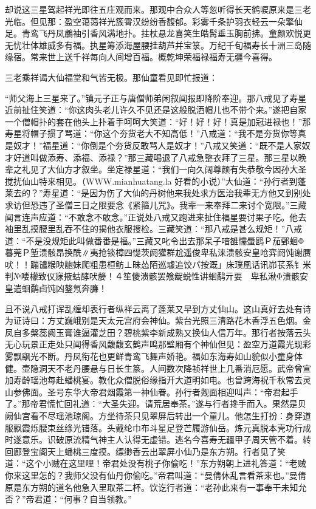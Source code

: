 \documentclass[12pt,UTF8]{ctexbook}
\begin{document}
却说这三星驾起祥光即往五庄观而来。那观中合众人等忽听得长天鹤唳原来是三老光临。但见那：盈空蔼蔼祥光簇霄汉纷纷香馥郁。彩雾千条护羽衣轻云一朵擎仙足。青鸾飞丹凤鷫袖引香风满地扑。拄杖悬龙喜笑生皓髯垂玉胸前拂。童颜欢悦更无忧壮体雄威多有福。执星筹添海屋腰挂葫芦并宝箓。万纪千旬福寿长十洲三岛随缘宿。常来世上送千祥每向人间增百福。概乾坤荣福禄福寿无疆今喜得。

三老乘祥谒大仙福堂和气皆无极。那仙童看见即忙报道：

“师父海上三星来了。”镇元子正与唐僧师弟闲叙闻报即降阶奉迎。那八戒见了寿星近前扯住笑道：“你这肉头老儿许久不见还是这般脱洒帽儿也不带个来。”遂把自家一个僧帽扑的套在他头上扑着手呵呵大笑道：“好！好！好！真是加冠进禄也！”那寿星将帽子掼了骂道：“你这个夯货老大不知高低！”八戒道：“我不是夯货你等真是奴才！”福星道：“你倒是个夯货反敢骂人是奴才！”八戒又笑道：“既不是人家奴才好道叫做添寿、添福、添禄？”那三藏喝退了八戒急整衣拜了三星。那三星以晚辈之礼见了大仙方才叙坐。坐定禄星道：“我们一向久阔尊颜有失恭敬今因孙大圣搅扰仙山特来相见。（WWW.mianhuatang.la 好看的小说）”大仙道：“孙行者到蓬莱去的？”寿星道：“是因为伤了大仙的丹树他来我处求方医治我辈无方他又到别处求访但恐违了圣僧三日之限要念《紧箍儿咒》。我辈一来奉拜二来讨个宽限。”三藏闻言连声应道：“不敢念不敢念。”正说处八戒又跑进来扯住福星要讨果子吃。他去袖里乱摸腰里乱吞不住的揭他衣服搜检。三藏笑道：“那八戒是甚么规矩！”八戒道：“不是没规矩此叫做番番是福。”三藏又叱令出去那呆子喑雒懦蜃鸥Ｐ茄鄄蛔Φ暮莞Ｐ堑溃骸昂换酰∥夷抢锬樟四憷茨阏獾群尬遥俊卑私涞溃骸安皇呛弈阏饨谢赝吠！！蹦谴糇映龅妹爬粗患桓鲂⊥昧怂陌巡璩追饺パ按溉」床璞凰话讯峁苌系钅米判№喽檬致仪寐掖蛄酵吠嫠！４笙傻溃骸罢飧龊蜕性讲蛔鹬亓耍　卑私湫Φ溃骸安皇遣蛔鹬卣饨凶鏊氖奔臁！

且不说八戒打诨乱缠却表行者纵祥云离了蓬莱又早到方丈仙山。这山真好去处有诗为证诗曰：方丈巍峨别是天太元宫府会神仙。紫台光照三清路花木香浮五色烟。金凤自多槃蕊阙玉膏谁逼灌芝田？碧桃紫李新成熟又换仙人信万年。那行者按落云头无心玩景正走处只闻得香风馥馥玄鹤声鸣那壁厢有个神仙但见：盈空万道霞光现彩雾飘飖光不断。丹凤衔花也更鲜青鸾飞舞声娇艳。福如东海寿如山貌似小童身体健。壶隐洞天不老丹腰悬与日长生篆。人间数次降祯祥世上几番消厄愿。武帝曾宣加寿龄瑶池每赴蟠桃宴。教化众僧脱俗缘指开大道明如电。也曾跨海祝千秋常去灵山参佛面。圣号东华大帝君烟霞第一神仙眷。孙行者觌面相迎叫声：“帝君起手了。”那帝君慌忙回礼道：“大圣失迎。请荒居奉茶。”遂与行者搀手而入。果然是贝阙仙宫看不尽瑶池琼阁。方坐待茶只见翠屏后转出一个童儿。他怎生打扮：身穿道服飘霞烁腰束丝绦光错落。头戴纶巾布斗星足登芒履游仙岳。炼元真脱本壳功行成时遂意乐。识破原流精气神主人认得无虚错。逃名今喜寿无疆甲子周天管不着。转回廊登宝阁天上蟠桃三度摸。缥缈香云出翠屏小仙乃是东方朔。行者见了笑道：“这个小贼在这里哩！帝君处没有桃子你偷吃！”东方朔朝上进礼答道：“老贼你来这里怎的？我师父没有仙丹你偷吃。”帝君叫道：“曼倩休乱言看茶来也。”曼倩原是东方朔的道名他急入里取茶二杯。饮讫行者道：“老孙此来有一事奉干未知允否？”帝君道：“何事？自当领教。”
\end{document}
